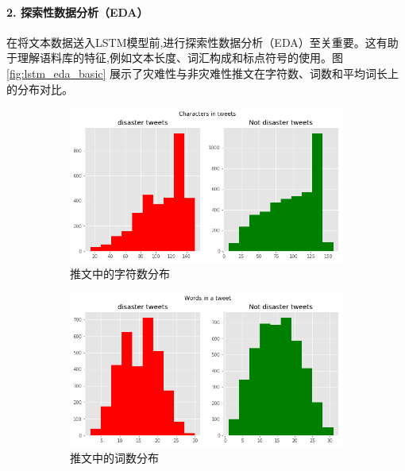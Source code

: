 \paragraph{2. 探索性数据分析（EDA）}
在将文本数据送入LSTM模型前,进行探索性数据分析（EDA）至关重要。这有助于理解语料库的特征,例如文本长度、词汇构成和标点符号的使用。图 \ref{fig:lstm_eda_basic} 展示了灾难性与非灾难性推文在字符数、词数和平均词长上的分布对比。
\begin{figure}[H]
    \centering
    \begin{subfigure}[b]{0.48\textwidth}
        \centering
        \includegraphics[width=\textwidth]{figures/LSTM2.png}
        \caption{推文中的字符数分布}
        \label{fig:char_dist}
    \end{subfigure}
    \hfill
    \begin{subfigure}[b]{0.48\textwidth}
        \centering
        \includegraphics[width=\textwidth]{figures/LSTM3.png}
        \caption{推文中的词数分布}
        \label{fig:word_dist}
    \end{subfigure}
    \vspace{1cm}
    \begin{subfigure}[b]{0.48\textwidth}

\end{subfigure}
\end{figure}
